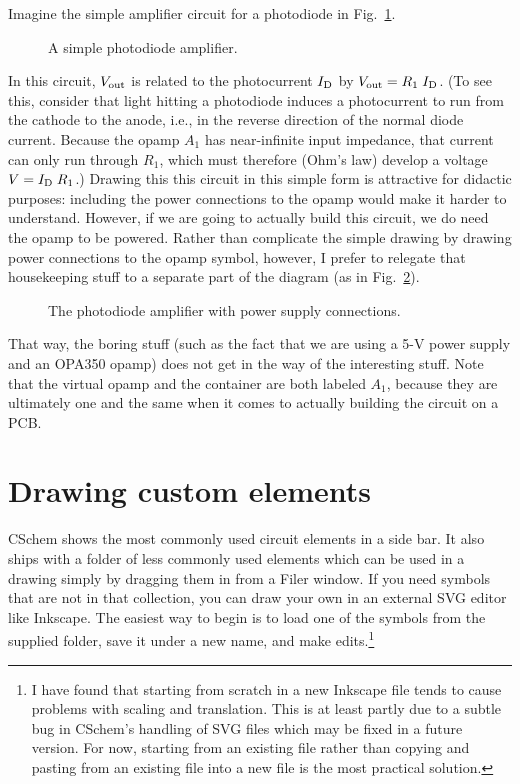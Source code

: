 \documentclass[11pt]{report}
\def\subfig#1#2{{\sf\small\bfseries#1}\raisebox{-.2in}{\raisebox{-.5\height}{\texttt{[image: \#2]}}}}
\def\sub#1{\textrm{\scriptsize#1}}
\begin{document}
Imagine the simple amplifier circuit for a photodiode in Fig.~\ref{pdamp}.
%
\begin{figure}[h]
  \mbox{}\hfill\subfig{}{ug-pdamp}\hfill\mbox{}
  \caption{A simple photodiode amplifier.}\label{pdamp}
\end{figure}
%
In this circuit, $V_\textrm{\scriptsize out}$ is related to the photocurrent
$I_\sub{D}$ by $V_\sub{out} = R_1\;I_\sub{D}$. (To see this, consider that light
hitting a photodiode induces a photocurrent to run from the cathode to
the anode, i.e., in the reverse direction of the normal diode
current. Because the opamp $A_1$ has near-infinite input impedance,
that current can only run through $R_1$, which must therefore (Ohm's law) develop
a voltage $V = I_\sub{D}\;R_1$.) Drawing this this circuit in
this simple form is attractive for didactic purposes: including the power connections to the opamp would
make it harder to understand. However, if we are going to actually
build this circuit, we do need the opamp to be powered. Rather than
complicate the simple drawing by
drawing power connections to the opamp symbol, however, I prefer to relegate
that housekeeping stuff to a separate part of the diagram (as in Fig.~\ref{pdampcont}).
%
\begin{figure}[h]
  \mbox{}\hfill\subfig{}{ug-pdamp-cont}\hfill\mbox{}
  \caption{The photodiode amplifier with power supply
    connections.}\label{pdampcont}
\end{figure}
%
That way, the boring stuff (such as the fact that we are using a 5-V
power supply and an OPA350 opamp) does not get in the way of the
interesting stuff. Note that the virtual opamp and the container are
both labeled $A_1$, because they are ultimately one and the same when
it comes to actually building the circuit on a PCB.

\section{Drawing custom elements}\label{sec.custom}

CSchem shows the most commonly used circuit elements in a side bar. It
also ships with a folder of less commonly used elements which can be
used in a drawing simply by dragging them in from a Filer window. If
you need symbols that are not in that collection, you can draw your
own in an external SVG editor like Inkscape. The easiest way to begin
is to load one of the symbols from the supplied folder, save it under
a new name, and make edits.\footnote{I have found that starting from scratch
in a new Inkscape file tends to cause problems with scaling and
translation. This is at least partly due to a subtle bug in CSchem's handling
of SVG files which may be fixed in a future version. For now, starting
from an existing file rather than copying and pasting from an existing
file into a new file is the most practical solution.}
\end{document}
